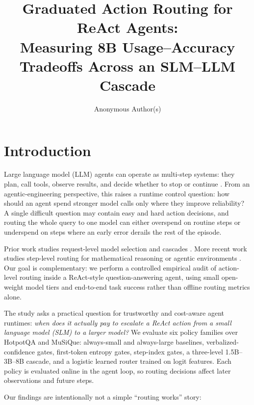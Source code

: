 \documentclass[sigplan,screen,review,anonymous,nonacm]{acmart}
\title{Graduated Action Routing for ReAct Agents:\\
Measuring 8B Usage--Accuracy Tradeoffs Across an SLM--LLM Cascade}
\author{Anonymous Author(s)}
\affiliation{
  \institution{Anonymous Institution}
  \country{Anonymous}
}
\begin{document}
\maketitle

\section{Introduction}

Large language model (LLM) agents can operate as multi-step
systems: they plan, call tools, observe results, and decide whether to stop or
continue \cite{react,redact,evoroute}. From an agentic-engineering perspective, this raises a runtime
control question: how should an agent spend stronger model calls only where
they improve reliability? A single difficult question may contain easy and hard
action decisions, and routing the whole query to one model can either
overspend on routine steps or underspend on steps where an early error derails
the rest of the episode.

Prior work studies request-level model selection and cascades
\cite{frugalgpt,routellm,hybridllm}. More recent work studies step-level
routing for mathematical reasoning or agentic environments
\cite{trim,redact,evoroute,tacitswitch}. Our goal is complementary: we
perform a controlled empirical audit of action-level routing inside a
ReAct-style question-answering agent, using small open-weight model tiers and
end-to-end task success rather than offline routing metrics alone.

The study asks a practical question for trustworthy and cost-aware agent
runtimes: \emph{when does it actually pay to escalate a ReAct action from a
small language model (SLM) to a larger model?}
We evaluate six policy families over HotpotQA and MuSiQue: always-small and
always-large baselines, verbalized-confidence gates, first-token entropy
gates, step-index gates, a three-level 1.5B--3B--8B cascade, and a logistic
learned router trained on logit features. Each policy is evaluated online in
the agent loop, so routing decisions affect later observations and future
steps.

Our findings are intentionally not a simple ``routing works'' story:
\end{document}
